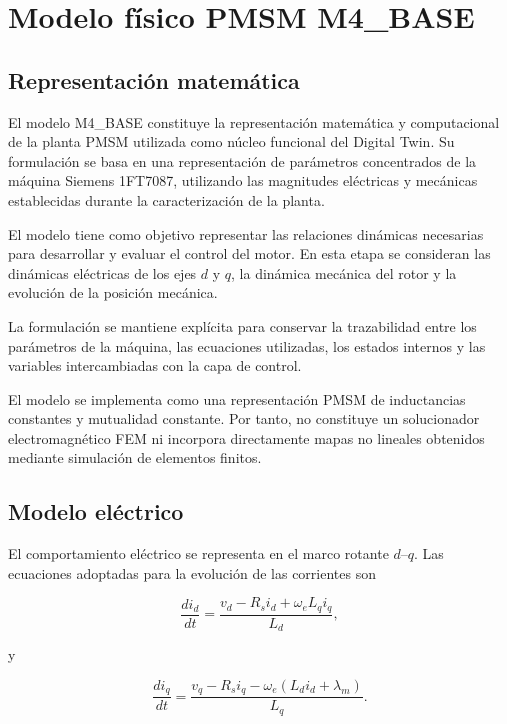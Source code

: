 \section{Modelo físico PMSM M4\_BASE}

\subsection{Representación matemática}

El modelo M4\_BASE constituye la representación matemática y computacional de la planta PMSM utilizada como núcleo funcional del Digital Twin. Su formulación se basa en una representación de parámetros concentrados de la máquina Siemens 1FT7087, utilizando las magnitudes eléctricas y mecánicas establecidas durante la caracterización de la planta.

El modelo tiene como objetivo representar las relaciones dinámicas necesarias para desarrollar y evaluar el control del motor. En esta etapa se consideran las dinámicas eléctricas de los ejes $d$ y $q$, la dinámica mecánica del rotor y la evolución de la posición mecánica.

La formulación se mantiene explícita para conservar la trazabilidad entre los parámetros de la máquina, las ecuaciones utilizadas, los estados internos y las variables intercambiadas con la capa de control.

El modelo se implementa como una representación PMSM de inductancias constantes y mutualidad constante. Por tanto, no constituye un solucionador electromagnético FEM ni incorpora directamente mapas no lineales obtenidos mediante simulación de elementos finitos.

\subsection{Modelo eléctrico}

El comportamiento eléctrico se representa en el marco rotante $d$--$q$. Las ecuaciones adoptadas para la evolución de las corrientes son

\begin{equation}
\frac{di_d}{dt}
=
\frac{v_d-R_s i_d+\omega_e L_q i_q}{L_d},
\end{equation}

y

\begin{equation}
\frac{di_q}{dt}
=
\frac{v_q-R_s i_q-\omega_e(L_d i_d+\lambda_m)}
{L_q}.
\end{equation}

